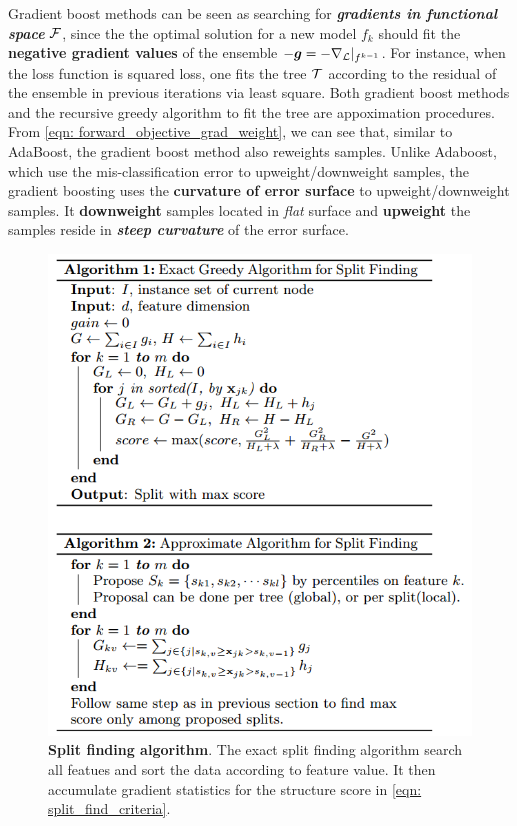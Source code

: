 \documentclass[11pt]{article}
\begin{document}
Gradient boost methods can be seen as searching for \emph{\textbf{gradients in functional space}} ${\mathcal F}$, since the the optimal solution for a new model $f_{k}$  should fit the \textbf{negative gradient values} of the ensemble $-\boldsymbol{g} = -\nabla_{{\mathcal L}}|_{f^{k-1}}$. For instance, when the loss function is squared loss, one fits the tree ${\mathcal T}$ according to the  residual of the ensemble in previous iterations via least square. Both gradient boost methods and the recursive greedy algorithm to fit the tree are appoximation procedures. From \eqref{eqn: forward_objective_grad_weight}, we can see that, similar to AdaBoost, the gradient boost method also reweights samples. Unlike Adaboost, which use the mis-classification error to upweight/downweight samples, the gradient boosting uses the \textbf{curvature of error surface} to upweight/downweight samples.  It \textbf{downweight} samples located in \emph{flat} surface and \textbf{upweight} the samples reside in \textbf{\emph{steep curvature}} of the error surface. 
\begin{figure}
\begin{minipage}[t]{1\linewidth}
  \centering
  \centerline{\includegraphics[scale = 0.5]{split_algo.png}}
\end{minipage}
\caption{\footnotesize{\textbf{Split finding algorithm}. The exact split finding algorithm search all featues and sort the data according to feature value. It then accumulate gradient statistics for the structure score in \eqref{eqn: split_find_criteria}. \citep{chen2016xgboost}}}
\label{fig: split}
\end{figure}
\end{document}
